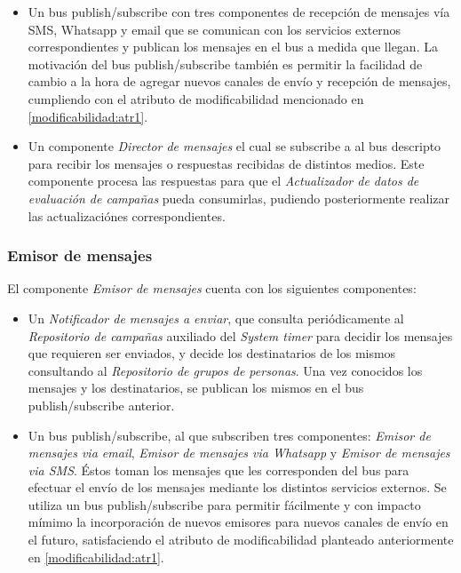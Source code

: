 \documentclass[a4paper, 10pt, twoside]{article}
\begin{document}
\begin{itemize}
  \item Un bus publish/subscribe con tres componentes de recepción de mensajes vía SMS, Whatsapp y email que se comunican con los servicios externos correspondientes y publican los mensajes en el bus a medida que llegan. La motivación del bus publish/subscribe también es permitir la facilidad de cambio a la hora de agregar nuevos canales de envío y recepción de mensajes, cumpliendo con el atributo de modificabilidad mencionado en \ref{modificabilidad:atr1}.

  \item Un componente \textit{Director de mensajes} el cual se subscribe a al bus descripto para recibir los mensajes o respuestas recibidas de distintos medios. Este componente procesa las respuestas para que el \textit{Actualizador de datos de evaluación de campañas} pueda consumirlas, pudiendo posteriormente realizar las actualizaciónes correspondientes.

\end{itemize}

\subsubsection{Emisor de mensajes}

El componente \textit{Emisor de mensajes} cuenta con los siguientes componentes:

\begin{itemize}
  \item Un \textit{Notificador de mensajes a enviar}, que consulta periódicamente al \textit{Repositorio de campañas} auxiliado del \textit{System timer} para decidir los mensajes que requieren ser enviados, y decide los destinatarios de los mismos consultando al \textit{Repositorio de grupos de personas}. Una vez conocidos los mensajes y los destinatarios, se publican los mismos en el bus publish/subscribe anterior.

  \item Un bus publish/subscribe, al que subscriben tres componentes: \textit{Emisor de mensajes via email}, \textit{Emisor de mensajes via Whatsapp} y \textit{Emisor de mensajes via SMS}. Éstos toman los mensajes que les corresponden del bus para efectuar el envío de los mensajes mediante los distintos servicios externos. Se utiliza un bus publish/subscribe para permitir fácilmente y con impacto mímimo la incorporación de nuevos emisores para nuevos canales de envío en el futuro, satisfaciendo el atributo de modificabilidad planteado anteriormente en \ref{modificabilidad:atr1}.
\end{itemize}
\end{document}

